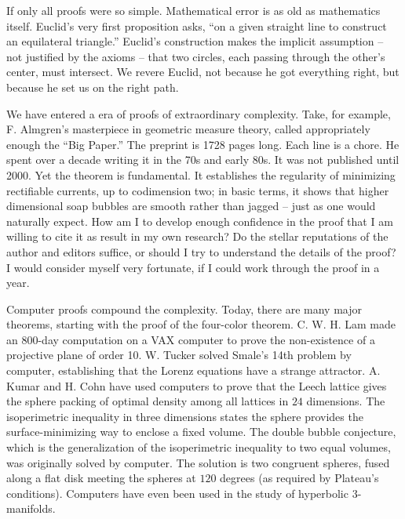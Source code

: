 \documentclass{llncs}
\begin{document}
If only all proofs were so simple.  
Mathematical error is as old as mathematics itself.
Euclid's very first proposition asks, ``on a given straight line
to construct an equilateral triangle.''  Euclid's construction
makes the implicit assumption -- not justified by the axioms -- that
two circles, each passing through the other's center, must intersect.
We revere Euclid, not because he got everything right, but because
he set us on the right path.

We have entered a era of proofs of extraordinary complexity.
Take, for example, F. Almgren's masterpiece in geometric measure
theory, called appropriately enough the ``Big Paper.'' 
The preprint is
1728 pages long. Each line is a chore. He spent over a decade writing it in the 70s and
early 80s.  It was not published until 2000.  Yet the theorem
is fundamental.  It establishes the regularity of minimizing
rectifiable currents, up to codimension two;  in basic terms, 
it shows that higher dimensional soap bubbles are smooth
rather than jagged -- just
as one would naturally expect.  How am I to develop enough confidence
in the proof that I am willing to cite it as result in my own research?
Do the stellar reputations of the author
and editors suffice, or should I try to understand the details of the
proof?  I
would consider myself very fortunate, if I could work through the proof
in a year.

Computer proofs 
compound the complexity. %
Today, there are many major theorems, starting with the proof
of the four-color theorem.
C. W. H. Lam made an 800-day computation on a VAX computer to
prove the non-existence of a projective plane of order 10.
 W. Tucker solved Smale's 14th problem by computer, establishing
that the Lorenz equations have a strange attractor. 
A. Kumar and H. Cohn have used computers to prove 
that the Leech lattice gives
the sphere packing of optimal density among all lattices in $24$
dimensions.
The isoperimetric inequality in three dimensions states the
sphere provides the surface-minimizing way to enclose a fixed volume.
The double bubble conjecture, which is the generalization of
the isoperimetric inequality to two equal volumes, was originally solved
by computer.  The solution is two congruent spheres, fused along
a flat disk meeting the spheres at $120$ degrees (as required
by Plateau's conditions).
Computers have even been used in the study of hyperbolic $3$-manifolds.
%
 
\end{document}
